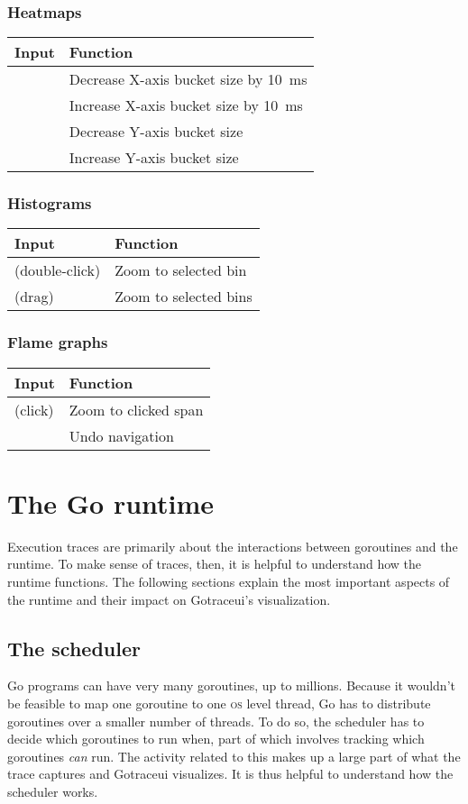 \documentclass[10pt,letterpaper,oneside,openany,english]{memoir}
\newcommand{\shortcut}{\ctrl{} or \cmdmac}
\newenvironment{keybindings}{%
\begingroup
\def\arraystretch{1.5}%
\begin{tabular}{ll}
  Input & Function \\
  \hline
}{%
\end{tabular}
\endgroup
}
\begin{document}
\subsection*{Heatmaps}

\begin{keybindings}
  \keys{\arrowkey{<}} & Decrease X-axis bucket size by \qty{10}{\milli\second} \\
  \keys{\arrowkey{>}} & Increase X-axis bucket size by \qty{10}{\milli\second} \\
  \keys{\arrowkey{v}} & Decrease Y-axis bucket size \\
  \keys{\arrowkey{^}} & Increase Y-axis bucket size
\end{keybindings}

\subsection*{Histograms}

\begin{keybindings}
  \keys{LMB} (double-click) & Zoom to selected bin \\
  \keys{\shortcut + LMB} (drag) & Zoom to selected bins
\end{keybindings}

\subsection*{Flame graphs}

\begin{keybindings}
  \keys{\shortcut + LMB} (click) & Zoom to clicked span \\
  \keys{\shortcut + Z} & Undo navigation
\end{keybindings}

\chapter{The Go runtime}

Execution traces are primarily about the interactions between goroutines and the runtime.
To make sense of traces, then, it is helpful to understand how the runtime functions.
The following sections explain the most important aspects of the runtime and their impact on Gotraceui's visualization.

\section{The scheduler}
Go programs can have very many goroutines, up to millions.
Because it wouldn't be feasible to map one goroutine to one \textsc{os} level thread,
Go has to distribute goroutines over a smaller number of threads.
To do so, the scheduler has to decide which goroutines to run when,
part of which involves tracking which goroutines {\em can} run.
The activity related to this makes up a large part of what the trace captures and Gotraceui visualizes.
It is thus helpful to understand how the scheduler works.
\end{document}
